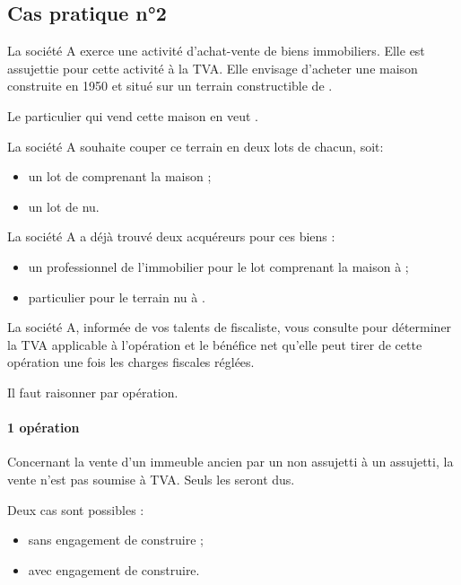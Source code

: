 	\subsection*{Cas pratique n°2}

		\begin{enonce}
			La société A exerce une activité d’achat-vente de biens immobiliers.  Elle est assujettie pour cette activité à la TVA. Elle envisage d’acheter une maison construite en 1950 et situé sur un terrain constructible de .


			\medskip Le particulier qui vend cette maison en veut .


			\medskip La société A souhaite couper ce terrain en deux lots de  chacun, soit:

			\begin{itemize}
				\item un lot de  comprenant la maison ;

				\item un lot de  nu.

			\end{itemize}

			\medskip La société A a déjà trouvé deux acquéreurs pour ces biens :

			\begin{itemize}
				\item un professionnel de l’immobilier pour le lot comprenant la maison à  ;

				\item particulier pour le terrain nu à .
			\end{itemize}


			\medskip La société A, informée de vos talents de fiscaliste, vous consulte pour déterminer la TVA applicable à l’opération et le bénéfice net qu’elle peut tirer de cette opération une fois les charges fiscales réglées.

		\end{enonce}

		Il faut raisonner par opération.

		\paragraph{1\iere{} opération} Concernant la vente d'un immeuble ancien par un non assujetti à un assujetti, la vente n'est pas soumise à TVA. Seuls les \dmto seront dus.

		Deux cas sont possibles :
		\begin{itemize}
			\item sans engagement de construire ;
			\item avec engagement de construire.
		\end{itemize}

